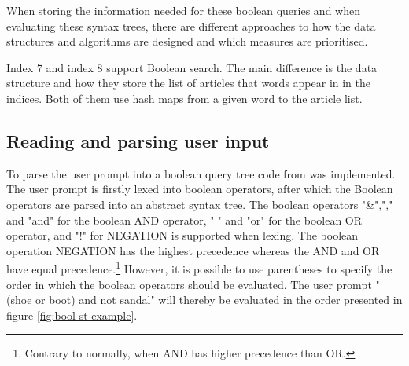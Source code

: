 When storing the information needed for these boolean queries and when evaluating these syntax trees, there are different approaches to how the data structures and algorithms are designed and which measures are prioritised. 

Index 7 and index 8 support Boolean search. The main difference is the data structure and how they store the list of articles that words appear in in the indices. Both of them use hash maps from a given word to the article list. 

\subsection{Reading and parsing user input}
To parse the user prompt into a boolean query tree code from \cite{parsing_lexing} was implemented. The user prompt is firstly lexed into boolean operators, after which the Boolean operators are parsed into an abstract syntax tree. The boolean operators "\&","," and "and" for the boolean AND operator, "|" and "or" for the boolean OR operator, and "!" for NEGATION is supported when lexing. The boolean operation NEGATION has the highest precedence whereas the AND and OR have equal precedence.\footnote{Contrary to normally, when AND has higher precedence than OR.} However, it is possible to use parentheses to specify the order in which the boolean operators should be evaluated. The user prompt "(shoe or boot) and not sandal" will thereby be evaluated in the order presented in figure \ref{fig:bool-st-example}.


